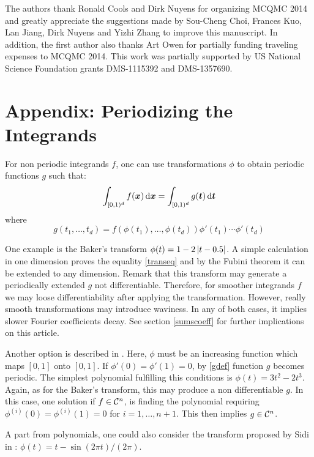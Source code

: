 \documentclass[graybox]{svmult}
\newcommand{\bst}{\boldsymbol{t}}    %
\newcommand{\bsx}{\boldsymbol{x}}    %
\begin{document}
\begin{acknowledgement}
The authors thank Ronald Cools and Dirk Nuyens for organizing MCQMC 2014 and greatly appreciate the suggestions made by Sou-Cheng Choi, Frances Kuo, Lan Jiang, Dirk Nuyens and Yizhi Zhang to improve this manuscript. In addition, the first author also thanks Art Owen for partially funding traveling expenses to MCQMC 2014.
This work was partially supported by US National Science Foundation grants DMS-1115392 and DMS-1357690. 
\end{acknowledgement}




\section*{Appendix: Periodizing the Integrands}\label{apendixperiodizing}
For non periodic integrands $f$, one can use transformations $\phi$ to obtain periodic functions $g$ such that:
\begin{equation}\label{transeq}
\int_{\cube} f(\bsx)  \, \dif \bsx=\int_{\cube} g(\bst)  \, \dif \bst
\end{equation}
where
\begin{equation}\label{gdef}
g(t_1,\dots,t_d)=f(\phi(t_1),\dots,\phi(t_d))\phi'(t_1)\cdots\phi'(t_d)
\end{equation}

One example is the Baker's transform $\phi(t)=1-2\left | t-0.5 \right |$. A simple calculation in one dimension proves the equality \eqref{transeq} and by the Fubini theorem it can be extended to any dimension. Remark that this transform may generate a periodically extended $g$ not differentiable. Therefore, for smoother integrands $f$ we may loose differentiability after applying the transformation. However, really smooth transformations may introduce waviness. In any of both cases, it implies slower Fourier coefficients decay. See section \ref{sumscoeff} for further implications on this article.

Another option is described in \cite[Sec. 2.12]{SloJoe94}. Here, $\phi$ must be an increasing function which maps $[0,1]$ onto $[0,1]$. If $\phi'(0)=\phi'(1)=0$, by \eqref{gdef} function $g$ becomes periodic. The simplest polynomial fulfilling this conditions is $\phi(t)=3t^2-2t^3$. Again, as for the Baker's transform, this may produce a non differentiable $g$. In this case, one solution if $f\in\mathcal{C}^n$, is finding the polynomial requiring $\phi^{(i)}(0)=\phi^{(i)}(1)=0$ for $i=1,\dots,n+1$. This then implies $g\in\mathcal{C}^n$.

A part from polynomials, one could also consider the transform proposed by Sidi in \cite{Sid93}: $\phi(t)=t-\sin(2\pi t)/(2\pi)$.
\end{document}
